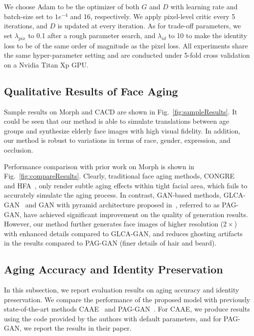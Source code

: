 \documentclass[10pt,twocolumn,letterpaper]{article}
\begin{document}
We choose Adam to be the optimizer of both $G$ and $D$ with learning rate and batch-size set to $1e^{-4}$ and 16, respectively. 
We apply pixel-level critic every 5 iterations, and $D$ is updated at every iteration. 
As for trade-off parameters, we set $\lambda_{pix}$ to 0.1 after a rough parameter search, and $\lambda_{id}$ to 10 to make the identity loss to be of the same order of magnitude as the pixel loss.
All experiments share the same hyper-parameter setting and are conducted under 5-fold cross validation on a Nvidia Titan Xp GPU.

\subsection{Qualitative Results of Face Aging}
Sample results on Morph and CACD are shown in Fig.~\ref{fig:sampleResults}. It could be seen that our method is able to simulate translations between age groups and synthesize elderly face images with high visual fidelity. In addition, our method is robust to variations in terms of race, gender, expression, and occlusion.

Performance comparison with prior work on Morph is shown in Fig.~\ref{fig:compareResults}. Clearly, traditional face aging methods, CONGRE~\cite{suo2012concatenational} and HFA~\cite{yang2016face}, only render subtle aging effects within tight facial area, which fails to accurately simulate the aging process.
In contrast, GAN-based methods, GLCA-GAN~\cite{li2018global} and GAN with pyramid architecture proposed in~\cite{yang2017learning}, referred to as PAG-GAN, have achieved significant improvement on the quality of generation results. 
However, our method further generates face images of higher resolution ($2\times$) with enhanced details compared to GLCA-GAN, and reduces ghosting artifacts in the results compared to PAG-GAN (\eg finer details of hair and beard).

\subsection{Aging Accuracy and Identity Preservation}
In this subsection, we report evaluation results on aging accuracy and identity preservation. We compare the performance of the proposed model with previously state-of-the-art methods CAAE~\cite{zhang2017age} and PAG-GAN~\cite{yang2017learning}. 
For CAAE, we produce results using the code provided by the authors with default parameters, and for PAG-GAN, we report the results in their paper.
\end{document}
